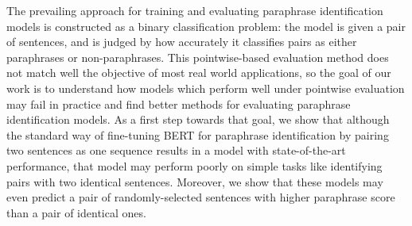 The prevailing approach for training and evaluating paraphrase identification models is constructed as a binary classification problem: the model is given a pair of sentences, and is judged by how accurately it classifies pairs as either paraphrases or non-paraphrases. This pointwise-based evaluation method does not match well the objective of most real world applications, so the goal of our work is to understand how models which perform well under pointwise evaluation may fail in practice and find better methods for evaluating paraphrase identification models. As a first step towards that goal, we show that although the standard way of fine-tuning BERT for paraphrase identification by pairing two sentences as one sequence results in a model with state-of-the-art performance, that model may perform poorly on simple tasks like identifying pairs with two identical sentences. Moreover, we show that these models may even predict a pair of randomly-selected sentences with higher paraphrase score than a pair of identical ones.
